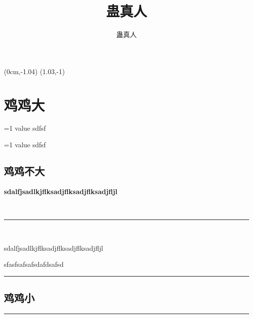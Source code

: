 \documentclass[hyperref,UTF8]{ctexrep}
\title{蛊真人}
\author{蛊真人}
\newenvironment{thisBody}
	{
		\zihao{3}
	}%
	{
		\clearpage
	}%
\begin{document}
\fancyput*(0cm,-1.04\textheight){ \setlength\fboxsep{0pt} \noindent\framebox[1.03\textwidth]{ \noindent \rule{0cm}{ 1.04\textheight } } }
\fancyput*(1.03\textwidth,-1\textheight){ \setlength\fboxsep{0pt} \noindent\framebox[2cm]{ \noindent \rule{0cm}{ \textheight } } }

 
\maketitle%
 

 


\newcommand\testvvvv[1]{ \ifnum #1=1 value \fi sdfsf }


\chapter{鸡鸡大}

\testvvvv{1}

\testvvvv{0}

\setcounter{secnumdepth}{-2}
\section{鸡鸡不大}
\setcounter{secnumdepth}{3}

	\begin{thisBody} 
		\textbf {sdalfjsadlkjflksadjflksadjflksadjfljl}

\noindent \, \hfill \rule[0.5ex]{0.95\linewidth}{0.5pt} \hfill \,

\noindent		\dag \hfill sdalfjsadlkjflksadjflksadjflksadjfljl \hfill \dag 

		sfasfsafsafsdafdsafsd
	\end{thisBody}

\noindent\rule[0.5ex]{\columnwidth}{0.6pt}
\section{鸡鸡小}
\noindent\rule[0.5ex]{\columnwidth}{0.6pt}
\end{document}
